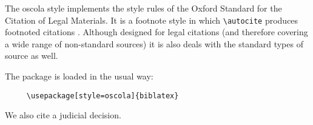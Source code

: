 
\usepackage[style=british]{csquotes}
\usepackage[style=oscola,backend=biber]{biblatex}


\usepackage[british]{babel}
\renewcommand{\showingstyle}{OSCOLA}
%
The \textsf{oscola} style implements the style rules of the Oxford Standard for the Citation of Legal Materials. It is a footnote style in which  \verb~\autocite~ produces footnoted citations \autocite{worman, reese}. Although designed for legal citations (and therefore covering a wide range of non-standard sources) it is also deals with the standard types of source as well.

\quad The package is loaded in the usual way:
\begin{verbatim}
     \usepackage[style=oscola]{biblatex}
\end{verbatim}

 We also cite a judicial decision.\autocite{donoghue}



